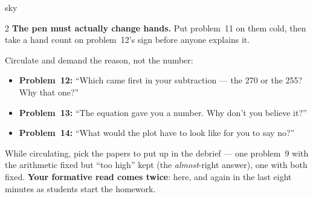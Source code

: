 \documentclass[10pt]{article}
\begin{document}
\begin{skillbox}{sky}
\begin{multicols}{2}
\textbf{The pen must actually change hands.} Put problem~11 on them cold, then take a hand
count on problem~12's sign before anyone explains it.

Circulate and demand the reason, not the number:
\begin{itemize}[leftmargin=1.1em, nosep]
  \item \textbf{Problem~12:} ``Which came first in your subtraction --- the 270 or the 255?
        Why that one?''
  \item \textbf{Problem~13:} ``The equation gave you a number. Why don't you believe it?''
  \item \textbf{Problem~14:} ``What would the plot have to look like for you to say no?''
\end{itemize}
While circulating, pick the papers to put up in the debrief --- one problem~9 with the
arithmetic fixed but ``too high'' kept (the \emph{almost}-right answer), one with both fixed.
\textbf{Your formative read comes twice}: here, and again in the last eight minutes as students
start the homework.
\end{multicols}
\end{skillbox}
\end{document}
